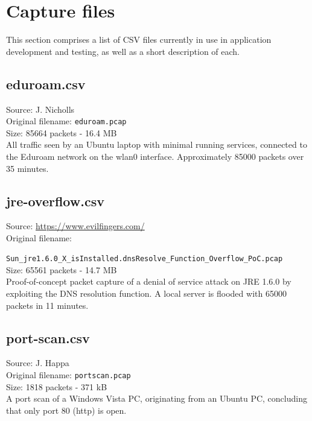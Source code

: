 \documentclass[12pt,a4paper]{article}
\begin{document}
    \pagebreak

    \section{Capture files}
        This section comprises a list of CSV files currently in use in
        application development and testing, as well as a short
        description of each.

        \subsection{eduroam.csv}
            Source: J. Nicholls\\
            Original filename: \verb!eduroam.pcap!\\
            Size: 85664 packets - 16.4 MB\\

            All traffic seen by an Ubuntu laptop with minimal running
            services, connected to the Eduroam network on the wlan0
            interface. Approximately 85000 packets over 35 minutes.

        \subsection{jre-overflow.csv}
            Source: \url{https://www.evilfingers.com/}\\
            Original filename:\\
            \verb!       Sun_jre1.6.0_X_isInstalled.dnsResolve_Function_Overflow_PoC.pcap!\\
            Size: 65561 packets - 14.7 MB\\

            Proof-of-concept packet capture of a denial of service
            attack on JRE 1.6.0 by exploiting the DNS resolution
            function. A local server is flooded with 65000 packets in
            11 minutes.

        \subsection{port-scan.csv}
            Source: J. Happa\\
            Original filename: \verb!portscan.pcap!\\
            Size: 1818 packets - 371 kB\\

            A port scan of a Windows Vista PC, originating from an
            Ubuntu PC, concluding that only port 80 (http) is open.
\end{document}
